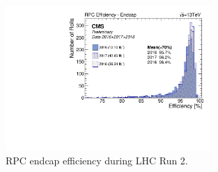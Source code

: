 \begin{figure}[H]
    \centering
    \includegraphics[width=0.7\textwidth]{Images/CMS/Muons/RPC/RPC_EffCmpEndcap.pdf}
    \caption{RPC endcap efficiency during LHC Run 2.}
    \label{fig:RPC_Endcap_Eff}
\end{figure}


